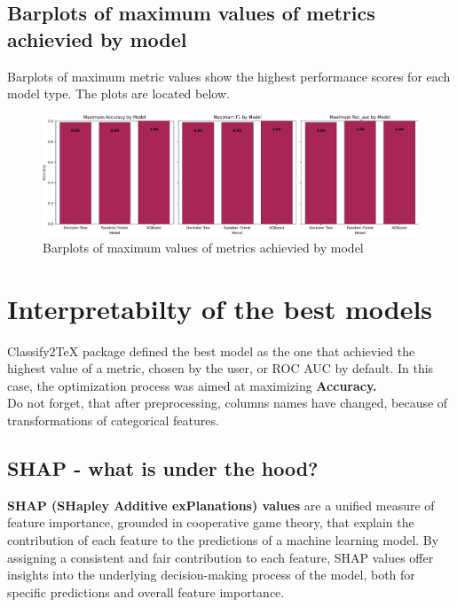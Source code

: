 \documentclass{article}%
\begin{document}
%
\subsection{Barplots of maximum values of metrics achievied by model}%
\label{subsec:Barplotsofmaximumvaluesofmetricsachieviedbymodel}%
Barplots of maximum metric values show the highest performance scores for each model type. The plots are located below.%


\begin{figure}[h!]%
\centering%
\includegraphics[width=460px]{ModelOptimization/barplots_max_metric.png}%
\caption{Barplots of maximum values of metrics achievied by model}%
\end{figure}

%
\newpage%
\section{Interpretabilty of the best models}%
\label{sec:Interpretabiltyofthebestmodels}%
Classify2TeX package defined the best model as the one that achievied the highest value of a metric, chosen by the user, or ROC AUC by default.%
In this case, the optimization process was aimed at maximizing%
\textbf{ Accuracy.}%
\\%
Do not forget, that after preprocessing, columns names have changed, because of transformations of categorical features.%
\subsection{SHAP {-} what is under the hood?}%
\label{subsec:SHAP{-}whatisunderthehood?}%

        \textbf{SHAP (SHapley Additive exPlanations) values} are a unified measure of feature importance, grounded in cooperative game theory, that explain the contribution of each feature to the predictions of a machine learning model. By assigning a consistent and fair contribution to each feature, SHAP values offer insights into the underlying decision-making process of the model, both for specific predictions and overall feature importance.
\end{document}
